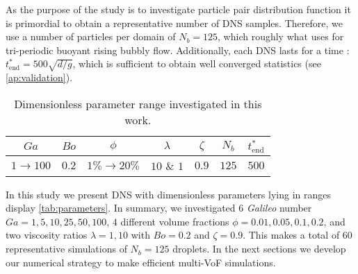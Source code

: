 As the purpose of the study is to investigate particle pair distribution function it is primordial to obtain a representative number of DNS samples. 
Therefore, we use a number of particles per domain of $N_b = 125$, which roughly what \citet{hidman2023assessing} uses for tri-periodic buoyant rising bubbly flow. 
Additionally, each DNS lasts for a time : $t^*_\text{end} = 500 \sqrt{d/g}$, which is sufficient to obtain well converged statistics (see \ref{ap:validation}).  
\begin{table}[h!]
    \centering
    \caption{Dimensionless parameter range investigated in this work.}
    \begin{tabular}{ccccccc}\hline
        $Ga$&$Bo$&$\phi$&$\lambda$&$\zeta$&$N_b$&$t^*_\text{end}$\\ \hline\hline
        $1\rightarrow 100$&$0.2$&$1\% \rightarrow 20\%$&$10$ \& $1$&$0.9$&$125$&$500$\\ \hline
    \end{tabular}
    \label{tab:simulations}
\end{table}
In this study we present DNS with dimensionless parameters lying in ranges display \ref{tab:parameters}.
In summary, we investigated $6$ \textit{Galileo} number $Ga = 1,5,10,25,50,100$, $4$ different volume fractions $\phi = 0.01,0.05,0.1,0.2$, and two viscosity ratios $\lambda =1,10$ with $Bo = 0.2$ and $\zeta = 0.9$. 
This makes a total of $60$ representative simulations of $N_b = 125$ droplets. 
In the next sections we develop our numerical strategy to make efficient multi-VoF simulations. 







